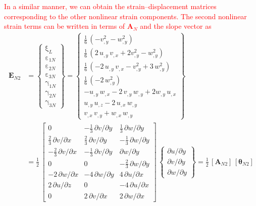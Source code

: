 \textcolor{red}{In a similar manner, we can obtain the strain--displacement matrices corresponding to the other nonlinear strain components. The second nonlinear strain terms can be written in terms of $\mathbf{A}_N$ and the slope vector as} 
\begin{equation}
\begin{aligned}
\mathbf{E}_{N2} & =  \begin{Bmatrix}
\mathrm \xi_{L} \\
\mathrm \varepsilon_{1N} \\
\mathrm \varepsilon_{2N} \\
\mathrm \varepsilon_{3N} \\
\mathrm \gamma_{1N} \\
\mathrm \gamma_{2N} \\
\mathrm \gamma_{3N} \end{Bmatrix} =
\begin{Bmatrix}
\tfrac{1}{6} \,  \left( - v_{,y}^2 - w_{,y}^2  \right)\\
\tfrac{1}{6} \,  \left( 2 \, u_{,y} \, v_{,x} + 2 v_{,y}^2 -  w_{,y}^2 \right) \\
\tfrac{1}{6} \,  \left( - 2 \, u_{,y} \, v_{,x} - v_{,y}^2 + 3 \, w_{,y}^2 \right) \\
\tfrac{1}{6} \,  \left(-2 \, w_{,y}^2 \right) \\ 
- u_{,y} \, w_{,x} - 2 \, v_{,y} \, w_{,y} + 2 w_{,y} \, u_{,x} \\
u_{,y} \, u_{,z} - 2 \, u_{,x} \, w_{,y} \\ 
v_{,x} \, v_{,y}  + w_{,x} \, w_{,y} \end{Bmatrix} \\
& = \frac{1}{2} \, \begin{bmatrix}
0 &  - \tfrac{1}{3} \, \partial v / \partial y & \tfrac{1}{3} \, \partial w / \partial y  \\
\tfrac{2}{3} \, \partial v / \partial x &  \tfrac{2}{3} \, \partial v / \partial y & - \tfrac{1}{3} \, \partial w / \partial y  \\
-\tfrac{2}{3} \, \partial v / \partial x  & -\tfrac{1}{3} \, \partial v / \partial y & \partial w / \partial y \\
0 & 0 & - \tfrac{2}{3} \, \partial w / \partial y   \\
- 2 \, \partial w / \partial x &  - 4 \, \partial w / \partial y & 4 \,  \partial u / \partial x  \\
2 \, \partial u / \partial z &  0 & - 4 \, \partial u / \partial x  \\
0 &  2 \, \partial v / \partial x &  2 \, \partial w / \partial x  \end{bmatrix} \, \begin{Bmatrix}
\partial u / \partial y\\
\partial v / \partial y \\
\partial w / \partial y
\end{Bmatrix}
= \tfrac{1}{2} \, [\mathbf{A}_{N2}] \, [\boldsymbol{\theta}_{N2}]
\end{aligned}
\end{equation}
